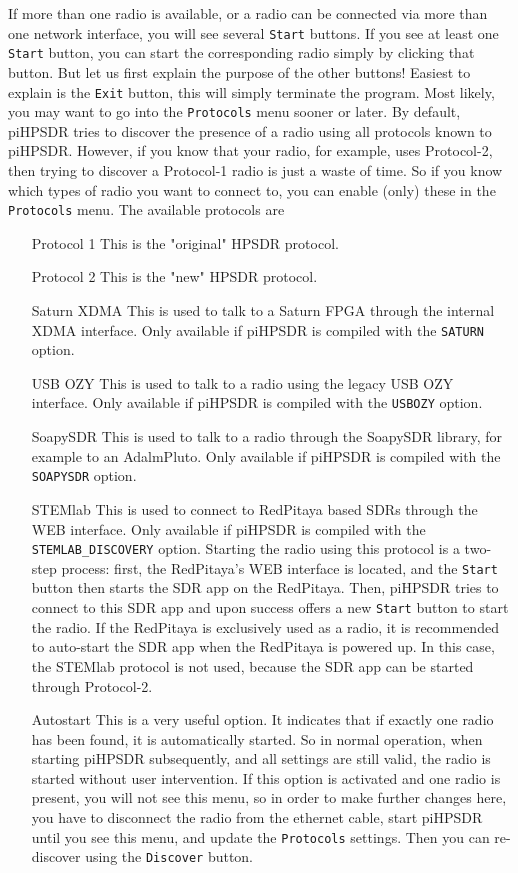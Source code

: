 \documentclass[12pt]{book}
\def\rett#1{\texttt{\color{red}#1}}
\def\pH{pi\-HPSDR\xspace}
\begin{document}
If more than one radio is available, or a radio can be connected via more than one network interface,
you will see several \rett{Start} buttons.
If you see at least one \rett{Start} button, you can start the corresponding radio simply
by clicking that button. But let us first explain the
purpose of the other buttons! Easiest to explain is the \rett{Exit} button, this will simply terminate
the program. Most likely, you may want to go into the \rett{Protocols} menu sooner or later.
By default, \pH tries to discover the presence of a radio using all protocols known to \pH. However,
if you know that your radio, for example, uses Protocol-2, then trying to discover a Protocol-1
radio is just a waste of time. So if you know which types of radio you want to connect to, you can enable
(only) these in the \rett{Protocols} menu. The available protocols are

\begin{itemize}[font=\texttt, left=80pt]
\item[Protocol 1]{This is the "original" HPSDR protocol.}
\item[Protocol 2]{This is the "new" HPSDR protocol.}
\item[Saturn XDMA]{This is used to talk to a Saturn FPGA through the internal XDMA interface. Only available
if \pH is compiled with the \texttt{SATURN}  option.}
\item[USB OZY]{This is used to talk to a radio using the legacy USB OZY interface. Only available if \pH
is compiled with the \texttt{USBOZY} option.}
\item[SoapySDR]{This is used to talk to a radio through the SoapySDR library, for example to an AdalmPluto.
Only available if \pH is compiled with the \texttt{SOAPYSDR} option.}
\item[STEMlab]{This is used to connect to RedPitaya based SDRs through the WEB interface. Only available if
\pH is compiled with the \texttt{STEMLAB\_DISCOVERY} option. Starting the radio using this protocol is a
two-step process:
first, the RedPitaya's WEB interface is located, and the \texttt{Start} button then starts the SDR app
on the RedPitaya. Then, \pH tries to connect to this SDR app and upon success offers a new
\texttt{Start} button to start the radio. If the RedPitaya is exclusively used as a radio, it is recommended
to auto-start the SDR app
when the RedPitaya is powered up. In this case, the STEMlab protocol is not used, because the SDR app can be started through Protocol-2.}
\item[Autostart]{This is a very useful option. It indicates that if exactly one radio has been found, it is
automatically started. So in normal operation, when starting \pH subsequently, and all settings are
still valid, the radio is started without user intervention. If this option is activated and one radio is
present, you will not see this menu, so in order to make further changes here, you have to disconnect the
radio from the ethernet cable, start \pH until you see this menu, and update the \rett{Protocols}
settings. Then you can re-discover using the \rett{Discover} button.}
\end{itemize}
\end{document}
